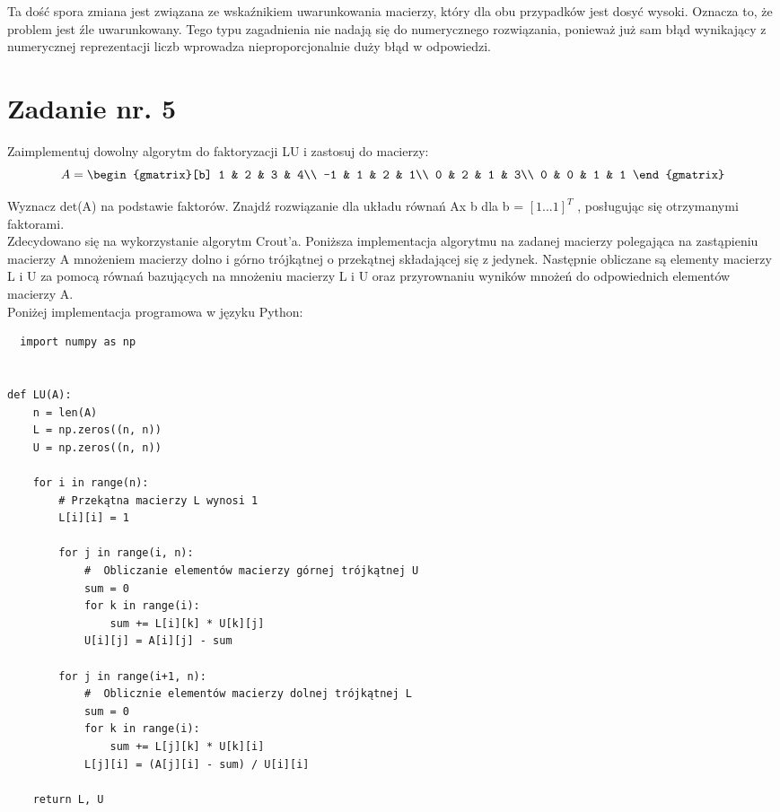 \documentclass{article}
\begin{document}
Ta dość spora zmiana jest związana ze wskaźnikiem uwarunkowania macierzy, który dla obu przypadków jest dosyć wysoki. Oznacza to, że problem jest źle uwarunkowany. Tego typu zagadnienia nie nadają się do numerycznego rozwiązania, ponieważ już sam błąd wynikający z numerycznej reprezentacji liczb wprowadza nieproporcjonalnie duży błąd w odpowiedzi.
\section{Zadanie nr. 5}
Zaimplementuj dowolny algorytm do faktoryzacji LU i zastosuj do macierzy:
\begin{equation}
  A=
  \begin{gmatrix}[b]
    1 & 2 & 3 & 4\\
    -1 & 1 & 2 & 1\\
    0 & 2 & 1 & 3\\
    0 & 0 & 1 & 1
  \end{gmatrix}
\end{equation}

Wyznacz det(A) na podstawie faktorów. Znajdź rozwiązanie dla układu równań Ax b dla b = $[1...1]^{T}$ , posługując się otrzymanymi faktorami.\\

Zdecydowano się na wykorzystanie algorytm Crout'a. Poniższa implementacja algorytmu na zadanej macierzy polegająca na zastąpieniu macierzy A mnożeniem macierzy dolno i górno trójkątnej o przekątnej składającej się z jedynek. Następnie obliczane są elementy macierzy L i U za pomocą równań bazujących na mnożeniu macierzy L i U oraz przyrownaniu wyników mnożeń do odpowiednich elementów macierzy A. \\


Poniżej implementacja programowa w języku Python:

\begin{lstlisting}
  import numpy as np


def LU(A):
    n = len(A)
    L = np.zeros((n, n))
    U = np.zeros((n, n))

    for i in range(n):
        # Przekątna macierzy L wynosi 1
        L[i][i] = 1

        for j in range(i, n):
            #  Obliczanie elementów macierzy górnej trójkątnej U
            sum = 0
            for k in range(i):
                sum += L[i][k] * U[k][j]
            U[i][j] = A[i][j] - sum

        for j in range(i+1, n):
            #  Oblicznie elementów macierzy dolnej trójkątnej L
            sum = 0
            for k in range(i):
                sum += L[j][k] * U[k][i]
            L[j][i] = (A[j][i] - sum) / U[i][i]

    return L, U

\end{lstlisting}
\end{document}

